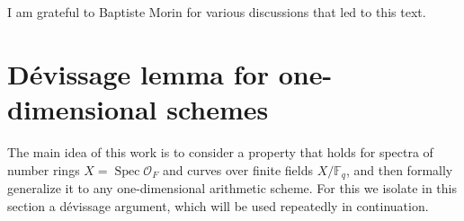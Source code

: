 \documentclass[draft]{article}
\DeclareMathOperator{\Spec}{Spec}
\newcommand{\FF}{\mathbb{F}}
\theoremstyle{myplain}
\theoremstyle{mydefinition}
\numberwithin{equation}{section}
\begin{document}
I am grateful to Baptiste Morin for various discussions that led to this text.


\section{D\'{e}vissage lemma for one-dimensional schemes}
\label{sec:devissage}

The main idea of this work is to consider a property that holds for spectra of
number rings $X = \Spec \mathcal{O}_F$ and curves over finite fields $X/\FF_q$,
and then formally generalize it to any one-dimensional arithmetic scheme.
For this we isolate in this section a d\'{e}vissage argument, which will be used
repeatedly in continuation.
\end{document}
